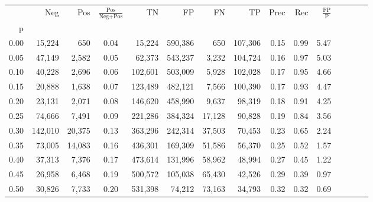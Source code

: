 \begin{tabular}{rrrcrrrrrrrrrrr}
\toprule
{} &      Neg &     Pos & $\frac{\text{Pos}}{\text{Neg}+\text{Pos}}$ &       TN &       FP &       FN &       TP &  Prec &   Rec & $\frac{\text{FP}}{\text{P}}$ \\
p    &          &         &                                            &          &          &          &          &       &       &                              \\
\midrule
0.00 &   15,224 &     650 &                                       0.04 &   15,224 &  590,386 &      650 &  107,306 &  0.15 &  0.99 &                         5.47 \\
0.05 &   47,149 &   2,582 &                                       0.05 &   62,373 &  543,237 &    3,232 &  104,724 &  0.16 &  0.97 &                         5.03 \\
0.10 &   40,228 &   2,696 &                                       0.06 &  102,601 &  503,009 &    5,928 &  102,028 &  0.17 &  0.95 &                         4.66 \\
0.15 &   20,888 &   1,638 &                                       0.07 &  123,489 &  482,121 &    7,566 &  100,390 &  0.17 &  0.93 &                         4.47 \\
0.20 &   23,131 &   2,071 &                                       0.08 &  146,620 &  458,990 &    9,637 &   98,319 &  0.18 &  0.91 &                         4.25 \\
0.25 &   74,666 &   7,491 &                                       0.09 &  221,286 &  384,324 &   17,128 &   90,828 &  0.19 &  0.84 &                         3.56 \\
0.30 &  142,010 &  20,375 &                                       0.13 &  363,296 &  242,314 &   37,503 &   70,453 &  0.23 &  0.65 &                         2.24 \\
0.35 &   73,005 &  14,083 &                                       0.16 &  436,301 &  169,309 &   51,586 &   56,370 &  0.25 &  0.52 &                         1.57 \\
0.40 &   37,313 &   7,376 &                                       0.17 &  473,614 &  131,996 &   58,962 &   48,994 &  0.27 &  0.45 &                         1.22 \\
0.45 &   26,958 &   6,468 &                                       0.19 &  500,572 &  105,038 &   65,430 &   42,526 &  0.29 &  0.39 &                         0.97 \\
0.50 &   30,826 &   7,733 &                                       0.20 &  531,398 &   74,212 &   73,163 &   34,793 &  0.32 &  0.32 &                         0.69 \\

\end{tabular}
